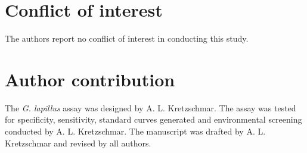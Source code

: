 \documentclass[12pt]{article}
\begin{document}
\section*{Conflict of interest}
The authors report no conflict of interest in conducting this study.

\section*{Author contribution}
The \emph{G. lapillus} assay was designed by A. L. Kretzschmar. 
The assay was tested for specificity, sensitivity, standard curves generated and environmental screening conducted by A. L. Kretzschmar. 
The manuscript was drafted by A. L. Kretzschmar and revised by all authors.

\FloatBarrier
\newpage

%
%

\end{document}
